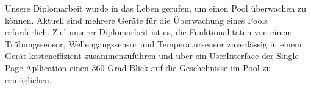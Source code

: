 Unsere Diplomarbeit wurde in das Leben gerufen, um einen Pool überwachen zu können.
Aktuell sind mehrere Geräte für die Überwachung eines Pools erforderlich.
Ziel unserer Diplomarbeit ist es, die Funktionalitäten 
von einem Trübungssensor, Wellengangssensor und Temperatursensor zuverlässig in einem Gerät kosteneffizient zusammenzuführen 
und über ein UserInterface der Single Page Apllication einen 360 Grad Blick auf die Geschehnisse im Pool zu ermöglichen. 